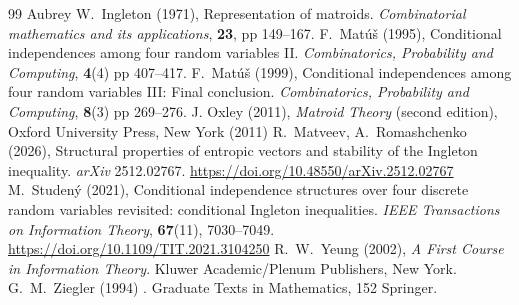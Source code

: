 \documentclass[10pt,a4paper]{amsart}
\begin{document}
\begin{thebibliography}{99}
 Aubrey W.~Ingleton (1971), Representation of matroids. \emph{Combinatorial mathematics and its applications}, {\bf23}, pp 149--167. %
 F.~Mat\'{u}\v{s} (1995), Conditional independences among four random variables II. \emph{Combinatorics, Probability and Computing}, {\bf4}(4) pp 407--417. %
 F.~Mat\'{u}\v{s} (1999), Conditional independences among four random variables III: Final conclusion. \emph{Combinatorics, Probability and Computing}, {\bf8}(3) pp 269--276. %
 J. Oxley (2011), \emph{Matroid Theory} (second edition), Oxford University Press, New York (2011) %
 R.~Matveev, A.~Romashchenko (2026), Structural properties of entropic vectors and stability of the Ingleton inequality. \emph{arXiv} 2512.02767. \url{https://doi.org/10.48550/arXiv.2512.02767} %
 M.~Studen\'y (2021), Conditional independence structures over four discrete random variables revisited: conditional Ingleton inequalities. \emph{IEEE Transactions on Information Theory}, {\bf67}(11), 7030--7049. \url{https://doi.org/10.1109/TIT.2021.3104250} %
 R.~W.~Yeung (2002), \emph{A First Course in Information Theory}. Kluwer Academic/Plenum Publishers, New York. %
 G.~M.~Ziegler (1994) . \newblock Graduate Texts in Mathematics, 152 Springer. %
\end{thebibliography}
\end{document}
